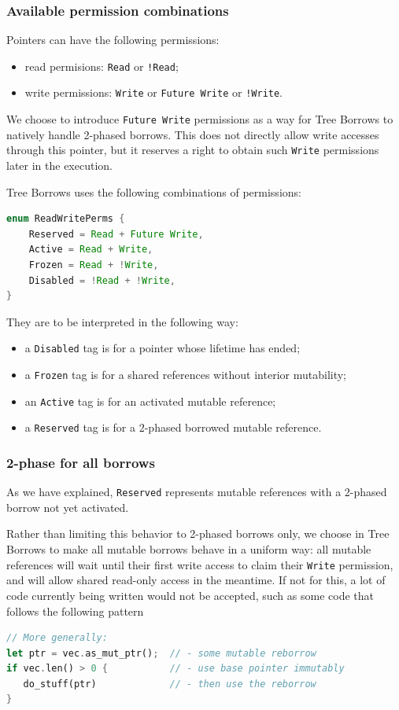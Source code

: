\documentclass[a4paper,11pt]{article}
\theoremstyle{plain}
\theoremstyle{definition}
\theoremstyle{remark}
\newcommand{\tperm}[1]{\texttt{#1}}
\begin{document}
\subsubsection{Available permission combinations}

Pointers can have the following permissions:
\begin{itemize}
    \item read permisions: \tperm{Read} or \tperm{!Read};
    \item write permissions: \tperm{Write} or \tperm{Future Write} or \tperm{!Write}.
\end{itemize}

We choose to introduce \tperm{Future Write} permissions as a way for Tree Borrows to
natively handle 2-phased borrows.
This does not directly allow write accesses through this pointer, but it reserves
a right to obtain such \tperm{Write} permissions later in the execution.

Tree Borrows uses the following combinations of permissions:
\begin{lstlisting}[language=rust]
enum ReadWritePerms {
    Reserved = Read + Future Write,
    Active = Read + Write,
    Frozen = Read + !Write,
    Disabled = !Read + !Write,
}
\end{lstlisting}

They are to be interpreted in the following way:
\begin{itemize}
    \item a \tperm{Disabled} tag is for a pointer whose lifetime has ended;
    \item a \tperm{Frozen} tag is for a shared references without interior mutability;
    \item an \tperm{Active} tag is for an activated mutable reference;
    \item a \tperm{Reserved} tag is for a 2-phased borrowed mutable reference.
\end{itemize}

\subsubsection{2-phase for all borrows}

As we have explained, \tperm{Reserved} represents mutable references with
a 2-phased borrow not yet activated.

Rather than limiting this behavior to 2-phased borrows only, we choose in Tree
Borrows to make all mutable borrows behave in a uniform way: all mutable references
will wait until their first write access to claim their \tperm{Write} permission,
and will allow shared read-only access in the meantime. If not for this, a lot
of code currently being written would not be accepted, such as some code that
follows the following pattern
\begin{lstlisting}[language=rust]
                             // More generally:
let ptr = vec.as_mut_ptr();  // - some mutable reborrow
if vec.len() > 0 {           // - use base pointer immutably
   do_stuff(ptr)             // - then use the reborrow
}
\end{lstlisting}
\end{document}
